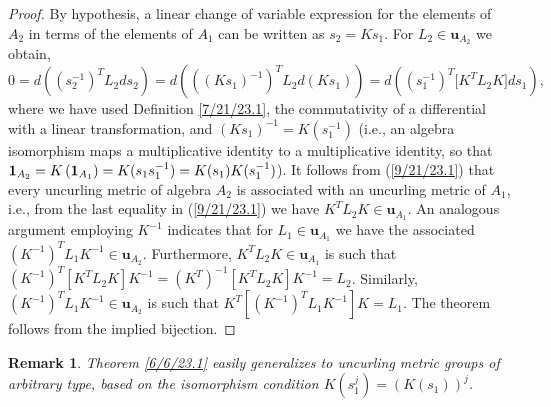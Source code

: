 \documentclass{amsart}
\numberwithin{equation}{section}
\newtheorem{remark}[theorem]{Remark}
\theoremstyle{definition}
\numberwithin{theorem}{section}
\begin{document}
\begin{proof} By hypothesis, a linear change of variable expression for the elements of $A_2$ in terms of the elements of $A_1$ can be written as $s_2= Ks_1$. For $L_2\in \mathbf{u}_{A_2}$ we obtain, \begin{equation} 0 = d\left((s_2^{-1})^T L_2 ds_2\right) =  d\left(((Ks_1)^{-1})^T L_2 d(Ks_1)\right) = d\left((s_1^{-1})^T \big[K^T L_2K\big]ds_1\right), \label{9/21/23.1}  \end{equation} where we have used Definition \ref{7/21/23.1}, the commutativity of a differential with a linear transformation, and $(Ks_1)^{-1} = K(s_1^{-1})$ (i.e., an algebra isomorphism maps a multiplicative identity to a multiplicative identity, so that ${\bf 1}_{A_2} = K\left(\mathbf{1}_{A_1}\right) = K(s_1s_1^{-1}) = K(s_1)K(s_1^{-1})$).  It follows from (\ref{9/21/23.1}) that every uncurling metric of algebra $A_2$ is associated with an uncurling metric of $A_1$, i.e., from the last equality in (\ref{9/21/23.1}) we have  $K^TL_2K\in\mathbf{u}_{A_1}$.  An analogous argument employing $K^{-1}$ indicates that for $L_1\in\mathbf{u}_{A_1}$ we have the associated $(K^{-1})^T L_1 K^{-1} \in \mathbf{u}_{A_2}$.  Furthermore, $K^T L_2K\in\mathbf{u}_{A_1}$ is such that $(K^{-1})^T [K^T L_2 K]K^{-1} = (K^T)^{-1} [K^T L_2 K]K^{-1} = L_2$.  Similarly, $(K^{-1})^T L_1K^{-1}\in\mathbf{u}_{A_2}$ is such that $K^T[(K^{-1})^T L_1K^{-1}] K = L_1$.  The theorem follows from the implied bijection. 
\end{proof}

\begin{remark} \label{9/18/23.1} {\rm Theorem \ref{6/6/23.1} easily generalizes to uncurling metric groups of arbitrary type, based on the isomorphism condition $K(s_1^j) = (K(s_1))^j$.   } \end{remark}
\end{document}

